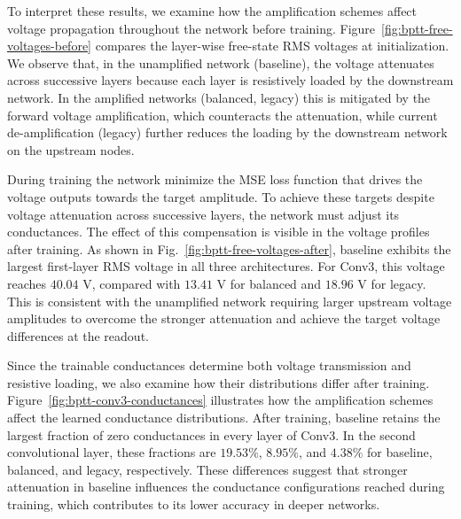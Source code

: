 \documentclass{article}
\begin{document}
To interpret these results, we examine how the amplification schemes affect voltage propagation throughout the network before training. Figure~\ref{fig:bptt-free-voltages-before} compares the layer-wise free-state RMS voltages at initialization. We observe that, in the unamplified network (baseline), the voltage attenuates across successive layers because each layer is resistively loaded by the downstream network. In the amplified networks (balanced, legacy) this is mitigated by the forward voltage amplification, which counteracts the attenuation, while current de-amplification (legacy) further reduces the loading by the downstream network on the upstream nodes.


During training the network minimize the MSE loss function that drives the  voltage outputs towards the target amplitude. To achieve these targets despite voltage attenuation across successive layers, the network must adjust its conductances. %
The effect of this compensation is visible in the voltage profiles after training. As shown in Fig.~\ref{fig:bptt-free-voltages-after}, baseline exhibits the largest first-layer RMS voltage in all three architectures. For Conv3, this voltage reaches $40.04$ V, compared with $13.41$ V for balanced and $18.96$ V for legacy. This is consistent with the unamplified network requiring larger upstream voltage amplitudes to overcome the stronger attenuation and achieve the target voltage differences at the readout.



Since the trainable conductances determine both voltage transmission and resistive loading, we also examine how their distributions differ after training. Figure~\ref{fig:bptt-conv3-conductances} illustrates how the amplification schemes affect the learned conductance distributions. After training, baseline retains the largest fraction of zero conductances in every layer of Conv3. In the second convolutional layer, these fractions are $19.53\%$, $8.95\%$, and $4.38\%$ for baseline, balanced, and legacy, respectively. 
These differences suggest that stronger attenuation in baseline influences the conductance configurations reached during training, which contributes to its lower accuracy in deeper networks.



\end{document}
